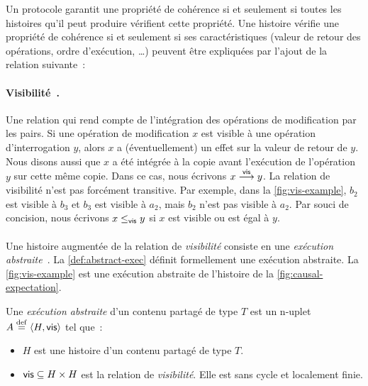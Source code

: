 Un protocole garantit une propriété de cohérence si et seulement si toutes les histoires qu'il peut produire vérifient cette propriété.
Une histoire vérifie une propriété de cohérence si et seulement si ses caractéristiques (valeur de retour des opérations, ordre d'exécution, \ldots) peuvent être expliquées par l'ajout de la relation suivante~:

\paragraph{Visibilité~\autocite{burckhardt_eventualconsistency_2014}.} Une relation qui rend compte de l'intégration des opérations de modification par les pairs.
Si une opération de modification $x$ est visible à une opération d'interrogation $y$, alors $x$ a (éventuellement) un effet sur la valeur de retour de $y$.
Nous disons aussi que $x$ a été intégrée à la copie avant l'exécution de l'opération $y$ sur cette même copie.
Dans ce cas, nous écrivons $x \vis y$.
La relation de visibilité n'est pas forcément transitive.
Par exemple, dans la \autoref{fig:vis-example}, $b_2$ est visible à $b_3$ et $b_3$ est visible à $a_2$, mais $b_2$ n'est pas visible à $a_2$.
Par souci de concision, nous écrivons $x \viseq y$ si $x$ est visible ou est égal à $y$.


\paragraph{} Une histoire augmentée de la relation de \emph{visibilité} consiste en une \emph{exécution abstraite}~\autocite{burckhardt_eventualconsistency_2014}.
La \autoref{def:abstract-exec} définit formellement une exécution abstraite.
La \autoref{fig:vis-example} est une exécution abstraite de l'histoire de la \autoref{fig:causal-expectation}.

\begin{definition}\label{def:abstract-exec}
Une \emph{exécution abstraite} d'un contenu partagé de type $T$ est un n-uplet $A \defeq \tuple*{H, \trm{vis}}$ tel que~:
\begin{itemize}
  \item $H$ est une histoire d'un contenu partagé de type $T$.

  \item $\trm{vis} \subseteq H \times H$ est la relation de \emph{visibilité}. Elle est sans cycle et localement finie.
\end{itemize}
\end{definition}

